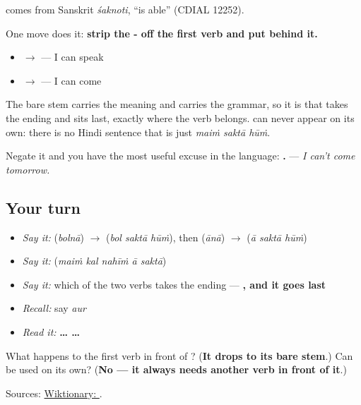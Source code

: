 \textbf{} comes from Sanskrit \emph{śaknoti}, \textquotedblleft{}is able\textquotedblright{} (CDIAL 12252).

\begin{grammarlens}[title={Grammar Lens: \hi{सकना} never stands alone}]
One move does it: \textbf{strip the - off the first verb and put  behind it.}

\begin{itemize}
\raggedright
  \item \textbf{} $\to$ \textbf{  } — I can speak
  \item \textbf{} $\to$ \textbf{  } — I can come
\end{itemize}

The bare stem carries the meaning and \textbf{} carries the grammar, so it is \textbf{} that takes the ending and sits last, exactly where the verb belongs. \textbf{} can never appear on its own: there is no Hindi sentence that is just \emph{maiṁ saktā hūṁ}.

Negate it and you have the most useful excuse in the language: \textbf{    .} — \emph{I can't come tomorrow.}
\end{grammarlens}

\subsection*{Your turn}
\begin{itemize}
\raggedright
  \item \emph{Say it:} \textbf{} (\emph{bolnā}) $\to$ \textbf{  } (\emph{bol saktā hūṁ}), then \textbf{} (\emph{ānā}) $\to$ \textbf{  } (\emph{ā saktā hūṁ})
  \item \emph{Say it:} \textbf{    } (\emph{maiṁ kal nahīṁ ā saktā})
  \item \emph{Say it:} which of the two verbs takes the ending — \textbf{, and it goes last}
  \item \emph{Recall:} say \emph{aur}
  \item \emph{Read it:} \textbf{…  …}
\end{itemize}

\begin{tcolorbox}[breakable,colback=teal!4,colframe=teal!35!black,title={Before you move on}]
What happens to the first verb in front of \textbf{}? (\textbf{It drops to its bare stem}.) Can \textbf{} be used on its own? (\textbf{No — it always needs another verb in front of it}.)

Sources: \href{https://en.wiktionary.org/wiki/\%E0\%A4\%B8\%E0\%A4\%95\%E0\%A4\%A8\%E0\%A4\%BE}{Wiktionary: }.
\end{tcolorbox}
